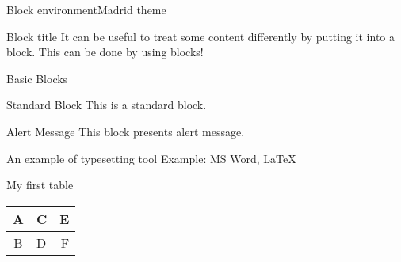 \documentclass{beamer}
\begin{document}
 \begin{frame}{Block environment}{Madrid theme}
 \begin{block}{Block title}
    It can be useful to treat some content differently by putting it into a block. This can be done by using blocks!
\end{block}
 \end{frame}

 \begin{frame}{Basic Blocks}
    \begin{block}{Standard Block}
        This is a standard block.
    \end{block}
    \begin{alertblock}{Alert Message}
        This block presents alert message.
    \end{alertblock}
    \begin{exampleblock}{An example of typesetting tool}
        Example: MS Word, \LaTeX{}
    \end{exampleblock}
\end{frame}


\begin{frame}{My first table}
 \begin{tabular}{|c||l||r|}
 \hline
\hline
    A & C & E\\
\hline
   B & D & F\\
\hline
\end{tabular}
\end{frame}
\end{document}

